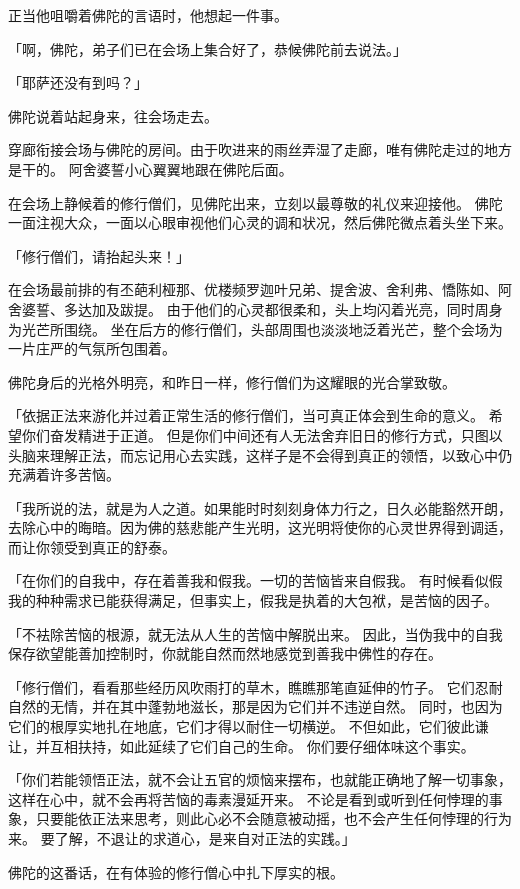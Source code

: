 \documentclass[twoside,openany]{book}
\begin{document}
正当他咀嚼着佛陀的言语时，他想起一件事。

「啊，佛陀，弟子们已在会场上集合好了，恭候佛陀前去说法。」

「耶萨还没有到吗？」

佛陀说着站起身来，往会场走去。

穿廊衔接会场与佛陀的房间。由于吹进来的雨丝弄湿了走廊，唯有佛陀走过的地方是干的。
阿舍婆誓小心翼翼地跟在佛陀后面。

在会场上静候着的修行僧们，见佛陀出来，立刻以最尊敬的礼仪来迎接他。
佛陀一面注视大众，一面以心眼审视他们心灵的调和状况，然后佛陀微点着头坐下来。

「修行僧们，请抬起头来！」

在会场最前排的有丕葩利桠那、优楼频罗迦叶兄弟、提舍波、舍利弗、憍陈如、阿舍婆誓、多达加及跋提。
由于他们的心灵都很柔和，头上均闪着光亮，同时周身为光芒所围绕。
坐在后方的修行僧们，头部周围也淡淡地泛着光芒，整个会场为一片庄严的气氛所包围着。

佛陀身后的光格外明亮，和昨日一样，修行僧们为这耀眼的光合掌致敬。

「依据正法来游化并过着正常生活的修行僧们，当可真正体会到生命的意义。
希望你们奋发精进于正道。
但是你们中间还有人无法舍弃旧日的修行方式，只图以头脑来理解正法，而忘记用心去实践，这样子是不会得到真正的领悟，以致心中仍充满着许多苦恼。

「我所说的法，就是为人之道。如果能时时刻刻身体力行之，日久必能豁然开朗，去除心中的晦暗。因为佛的慈悲能产生光明，这光明将使你的心灵世界得到调适，而让你领受到真正的舒泰。

「在你们的自我中，存在着善我和假我。一切的苦恼皆来自假我。
有时候看似假我的种种需求已能获得满足，但事实上，假我是执着的大包袱，是苦恼的因子。

「不袪除苦恼的根源，就无法从人生的苦恼中解脱出来。
因此，当伪我中的自我保存欲望能善加控制时，你就能自然而然地感觉到善我中佛性的存在。

「修行僧们，看看那些经历风吹雨打的草木，瞧瞧那笔直延伸的竹子。
它们忍耐自然的无情，并在其中蓬勃地滋长，那是因为它们并不违逆自然。
同时，也因为它们的根厚实地扎在地底，它们才得以耐住一切横逆。
不但如此，它们彼此谦让，并互相扶持，如此延续了它们自己的生命。
你们要仔细体味这个事实。

「你们若能领悟正法，就不会让五官的烦恼来摆布，也就能正确地了解一切事象，这样在心中，就不会再将苦恼的毒素漫延开来。
不论是看到或听到任何悖理的事象，只要能依正法来思考，则此心必不会随意被动摇，也不会产生任何悖理的行为来。
要了解，不退让的求道心，是来自对正法的实践。」

佛陀的这番话，在有体验的修行僧心中扎下厚实的根。
\end{document}
